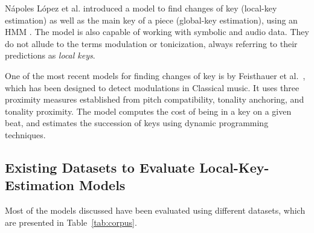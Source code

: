 \documentclass[sigconf]{acmart}
\begin{document}
N\'apoles L\'opez et al. introduced a model to find changes of key (local-key estimation) as well as the main key of a piece (global-key estimation), using an HMM \cite{napoleslopez2019key}. 
The model is also capable of working with symbolic and audio data. They do not allude to the terms modulation or tonicization, always referring to their predictions as \emph{local keys}.

One of the most recent models for finding changes of key is by Feisthauer et al.~\cite{feisthauer2020smc}, which has been designed to detect modulations in Classical music. 
It uses three proximity measures established from pitch compatibility, tonality anchoring, and tonality proximity. 
The model computes the cost of being in a key on a given beat, and estimates the succession of keys using dynamic programming techniques.



\subsection{Existing Datasets to Evaluate Local-Key-Estimation Models}

Most of the models discussed have been evaluated using different datasets, which are presented in Table~\ref{tab:corpus}.
\end{document}
